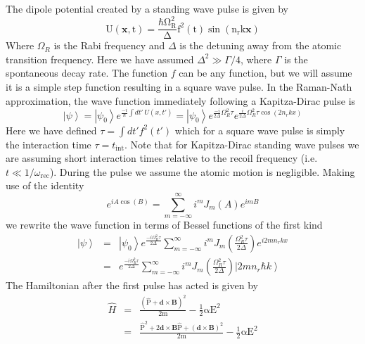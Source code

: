 \documentclass[twocolumn,english,pra,aps,superscriptaddress,floatfix]{revtex4-1}
\begin{document}
The dipole potential created by a standing wave pulse is given by
\begin{equation}
\mathrm{U(\mathbf{x},t)=\frac{\hbar \Omega_R^2}{\Delta}f^2(t)\sin{(n_rk\mathbf{x})}}
\end{equation}
Where $\Omega_R$ is the Rabi frequency and $\Delta$ is the detuning away from the atomic transition frequency.  Here we have assumed $\Delta^2 \gg \Gamma/4$, where $\Gamma$ is the spontaneous decay rate. The function $f$ can be any function, but we will assume it is a simple step function resulting in a square wave pulse.
In the Raman-Nath approximation, the wave function immediately following a Kapitza-Dirac pulse is \cite{meystre,ketterle}
\begin{equation}
\left|\psi\right>=\left|\psi_0\right>e^{\frac{-i}{\hbar}\int dt'\,U(x,t')}=\left|\psi_0\right>e^{\frac{-i}{2\Delta}\Omega_R^2\tau}e^{\frac{i}{2\Delta}\Omega_R^2\tau\cos{(2n_rkx)}}
\end{equation}
Here we have defined $\tau=\int dt' f^2(t')$ which for a square wave pulse is simply the interaction time $\tau=t_{\mathrm{int}}$.  Note that for Kapitza-Dirac standing wave pulses we are assuming short interaction times relative to the recoil frequency (i.e.\, $t\ll 1/\omega_{\mathrm{rec}}$).  During the pulse we assume the atomic motion is negligible.   Making use of the identity 
\begin{equation}
e^{iA\cos{(B)}}=\sum\limits_{m=-\infty}^{\infty}i^mJ_m(A)e^{imB}
\end{equation}
we rewrite the wave function in terms of Bessel functions of the first kind
\begin{eqnarray}
\left|\psi\right>&=&\left|\psi_0\right>e^{\frac{-i\Omega_R^2\tau}{2\Delta}}\sum\limits_{m=-\infty}^{\infty}i^mJ_m\left(\frac{\Omega_R^2\tau}{2\Delta}\right)e^{i2mn_rkx} \nonumber \\
&=&e^{\frac{-i\Omega_R^2\tau}{2\Delta}}\sum\limits_{m=-\infty}^{\infty}i^mJ_m\left(\frac{\Omega_R^2\tau}{2\Delta}\right)\left|2mn_r\hbar k\right>
\end{eqnarray}
The Hamiltonian after the first pulse has acted is given by
\begin{eqnarray}
\hat{H}&=&\mathrm{\frac{\left(\hat{P}+\mathbf{d}\times\mathbf{B}\right)^2}{2m}-\frac{1}{2}\alpha E^2}\nonumber \\
&=&\mathrm{\frac{\hat{P}^2+2\mathbf{d}\times\mathbf{B}\hat{P}+\left(\mathbf{d}\times\mathbf{B}\right)^2}{2m}-\frac{1}{2}\alpha E^2}\nonumber \\
\end{eqnarray}
\end{document}

